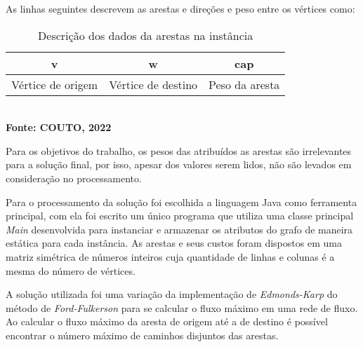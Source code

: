 As linhas seguintes descrevem as arestas e direções e peso entre os vértices como:

\begin{table}[htb]
	\centering
	\caption{\hspace{0.1cm} Descrição dos dados da arestas na instância}
	\vspace{-0.3cm} %
	\label{tab:tabela1}
	\begin{tabular}{|c|c|c|}
		\hline
		\textbf{v} & \textbf{w} & \textbf{cap} \\
		\hline
Vértice de origem & Vértice de destino & Peso da aresta\\
    \hline
\end{tabular}
	\vspace{.1cm}  %
	\small
	{\footnotesize\\ \textbf{Fonte: COUTO, 2022}}
\end{table}

Para os objetivos do trabalho, os pesos das atribuídos as arestas são irrelevantes para a solução final, por isso, apesar dos valores serem lidos, não são levados em consideração no processamento.

Para o processamento da solução foi escolhida a linguagem Java como ferramenta principal, com ela foi escrito um único programa que utiliza uma classe principal \textit{Main} desenvolvida para instanciar e armazenar os atributos do grafo de maneira estática para cada instância. As arestas e seus custos foram dispostos em uma matriz simétrica de números inteiros cuja quantidade de linhas e colunas é a mesma do número de vértices.

A solução utilizada foi uma variação da implementação de \textit{Edmonds-Karp} do método de \textit{Ford-Fulkerson} para se calcular o fluxo máximo em uma rede de fluxo. Ao calcular o fluxo máximo da aresta de origem até a de destino é possível encontrar o número máximo de caminhos disjuntos das arestas.








